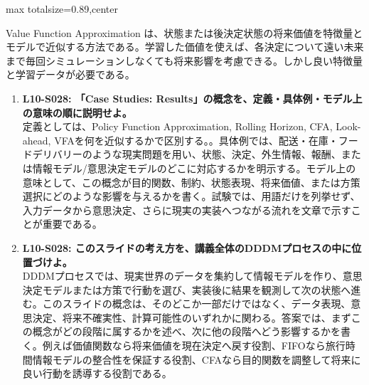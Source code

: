\begin{minipage}[t]{0.58\textwidth}
\begin{adjustbox}{max totalsize={\textwidth}{0.89\textheight},center}
\begin{minipage}{\textwidth}
Value Function Approximation は、状態または後決定状態の将来価値を特徴量とモデルで近似する方法である。学習した価値を使えば、各決定について遠い未来まで毎回シミュレーションしなくても将来影響を考慮できる。しかし良い特徴量と学習データが必要である。\par{}\begin{enumerate}\item \textbf{L10-S028: 「Case Studies: Results」の概念を、定義・具体例・モデル上の意味の順に説明せよ。}\\定義としては、Policy Function Approximation, Rolling Horizon, CFA, Look-ahead, VFAを何を近似するかで区別する。。具体例では、配送・在庫・フードデリバリーのような現実問題を用い、状態、決定、外生情報、報酬、または情報モデル/意思決定モデルのどこに対応するかを明示する。モデル上の意味として、この概念が目的関数、制約、状態表現、将来価値、または方策選択にどのような影響を与えるかを書く。試験では、用語だけを列挙せず、入力データから意思決定、さらに現実の実装へつながる流れを文章で示すことが重要である。\item \textbf{L10-S028: このスライドの考え方を、講義全体のDDDMプロセスの中に位置づけよ。}\\DDDMプロセスでは、現実世界のデータを集約して情報モデルを作り、意思決定モデルまたは方策で行動を選び、実装後に結果を観測して次の状態へ進む。このスライドの概念は、そのどこか一部だけではなく、データ表現、意思決定、将来不確実性、計算可能性のいずれかに関わる。答案では、まずこの概念がどの段階に属するかを述べ、次に他の段階へどう影響するかを書く。例えば価値関数なら将来価値を現在決定へ戻す役割、FIFOなら旅行時間情報モデルの整合性を保証する役割、CFAなら目的関数を調整して将来に良い行動を誘導する役割である。\end{enumerate}
\end{minipage}
\end{adjustbox}
\end{minipage}


